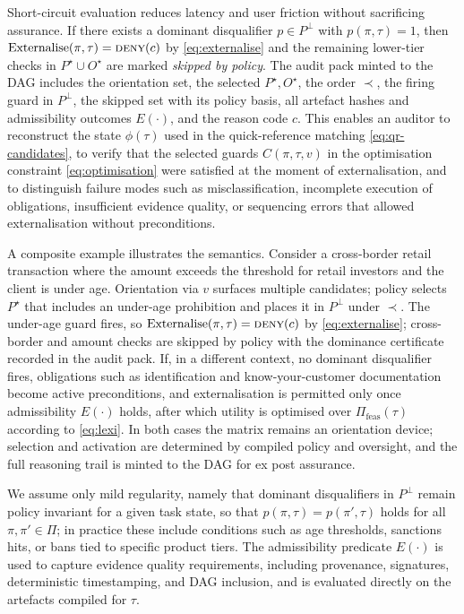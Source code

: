 \documentclass[oneside,10pt]{swissi}
\begin{document}
Short-circuit evaluation reduces latency and user friction without sacrificing assurance. If there exists a dominant disqualifier \(p\in P^{\perp}\) with \(p(\pi,\tau)=1\), then \(\mathrm{Externalise}(\pi,\tau)=\textsc{deny}(c)\) by \eqref{eq:externalise} and the remaining lower-tier checks in \(P^{\star}\cup O^{\star}\) are marked \emph{skipped by policy}. The audit pack minted to the DAG includes the orientation set, the selected \(P^{\star},O^{\star}\), the order \(\prec\), the firing guard in \(P^{\perp}\), the skipped set with its policy basis, all artefact hashes and admissibility outcomes \(E(\cdot)\), and the reason code \(c\). This enables an auditor to reconstruct the state \(\phi(\tau)\) used in the quick-reference matching \eqref{eq:qr-candidates}, to verify that the selected guards \(C(\pi,\tau,v)\) in the optimisation constraint \eqref{eq:optimisation} were satisfied at the moment of externalisation, and to distinguish failure modes such as misclassification, incomplete execution of obligations, insufficient evidence quality, or sequencing errors that allowed externalisation without preconditions.

A composite example illustrates the semantics. Consider a cross-border retail transaction where the amount exceeds the threshold for retail investors and the client is under age. Orientation via \(v\) surfaces multiple candidates; policy selects \(P^{\star}\) that includes an under-age prohibition and places it in \(P^{\perp}\) under \(\prec\). The under-age guard fires, so \(\mathrm{Externalise}(\pi,\tau)=\textsc{deny}(c)\) by \eqref{eq:externalise}; cross-border and amount checks are skipped by policy with the dominance certificate recorded in the audit pack. If, in a different context, no dominant disqualifier fires, obligations such as identification and know-your-customer documentation become active preconditions, and externalisation is permitted only once admissibility \(E(\cdot)\) holds, after which utility is optimised over \(\Pi_{\mathrm{feas}}(\tau)\) according to \eqref{eq:lexi}. In both cases the matrix remains an orientation device; selection and activation are determined by compiled policy and oversight, and the full reasoning trail is minted to the DAG for ex post assurance.

We assume only mild regularity, namely that dominant disqualifiers in \(P^{\perp}\) remain policy invariant for a given task state, so that \(p(\pi,\tau)=p(\pi',\tau)\) holds for all \(\pi,\pi'\in\Pi\); in practice these include conditions such as age thresholds, sanctions hits, or bans tied to specific product tiers. The admissibility predicate \(E(\cdot)\) is used to capture evidence quality requirements, including provenance, signatures, deterministic timestamping, and DAG inclusion, and is evaluated directly on the artefacts compiled for \(\tau\).
\end{document}
